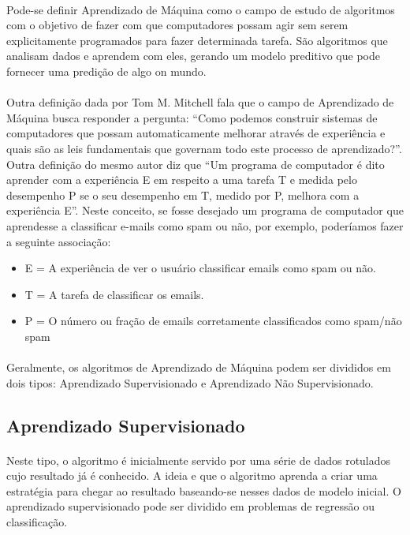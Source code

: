 \documentclass[grad,numbers]{coppe}
\begin{document}
  	\paragraph{}Pode-se definir Aprendizado de Máquina como o campo de estudo de algoritmos com o objetivo de fazer com que computadores possam agir sem serem explicitamente programados para fazer determinada tarefa. São algoritmos que analisam dados e aprendem com eles, gerando um modelo preditivo que pode fornecer uma predição de algo on mundo.
  	\paragraph{}Outra definição dada por Tom M. Mitchell\cite{ml-mitchell} fala que o campo de Aprendizado de Máquina busca responder a pergunta: ``Como podemos construir sistemas de computadores que possam automaticamente melhorar através de experiência e quais são as leis fundamentais que governam todo este processo de aprendizado?''. Outra definição do mesmo autor\cite{ml-mitchell-book} diz que ``Um programa de computador é dito aprender com a experiência E em respeito a uma tarefa T e medida pelo desempenho P se o seu desempenho em T, medido por P, melhora com a experiência E''. Neste conceito, se fosse desejado um programa de computador que aprendesse a classificar e-mails como spam ou não, por exemplo, poderíamos fazer a seguinte associação:
  	\begin{itemize}
  		\item E = A experiência de ver o usuário classificar emails como spam ou não.
			\item T = A tarefa de classificar os emails.
			\item P = O número ou fração de emails corretamente classificados como spam/não spam
  	\end{itemize}
  	\paragraph{}Geralmente, os algoritmos de Aprendizado de Máquina podem ser divididos em dois tipos: Aprendizado Supervisionado e Aprendizado Não Supervisionado.
  	\subsection{Aprendizado Supervisionado}
  		\paragraph{}Neste tipo, o algoritmo é inicialmente servido por uma série de dados rotulados cujo resultado já é conhecido. A ideia e que o algoritmo aprenda a criar uma estratégia para chegar ao resultado baseando-se nesses dados de modelo inicial. O aprendizado supervisionado pode ser dividido em problemas de regressão ou classificação.
\end{document}
